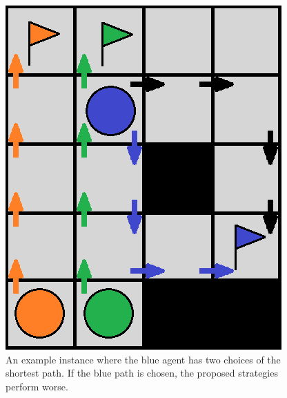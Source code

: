 \begin{figure}[ht]
\centering
\includegraphics[width=0.3\columnwidth]{img/p_counterexample.png}
\caption{An example instance where the blue agent has two choices of the shortest path. If the blue path is chosen, the proposed strategies perform worse.}
\label{fig:p_counterexample}
\end{figure}



